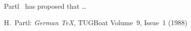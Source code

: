 \documentclass{article}
\begin{document}
Partl~\cite{pa} has proposed that \ldots
\begin{thebibliography}{99}
 H.~Partl:
\emph{German \TeX},
TUGBoat Volume~9, Issue~1 (1988)
\end{thebibliography}
\printindex
\end{document}
